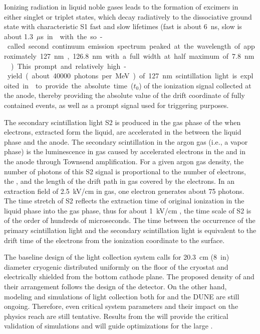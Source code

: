 Ionizing radiation in liquid noble gases leads to the formation of excimers in either singlet or triplet states, which decay radiatively to the dissociative ground state with characteristic S1 fast and slow lifetimes (fast is about \SI{6}{ns}, slow is about \SI{1.3}{$\mu$s} in \lar with the so-called second continuum emission spectrum peaked at the wavelength of approximately \SI{127}{nm}, \SI{126.8}{nm} with a full width at half maximum of \SI{7.8}{nm} \cite{Heindl}). This prompt and relatively high-yield (about \num{40000} photons per \si{MeV}) of \SI{127}{nm} scintillation light is exploited in \lartpc to provide the absolute time ($t_0$) of the ionization signal collected at the anode, thereby providing the absolute value of the drift coordinate of fully contained events, as well as a prompt signal used for triggering purposes.

The secondary scintillation light S2 is produced in the gas phase of the  when electrons, extracted form the liquid, are accelerated in the \efield between the liquid phase and the anode. The secondary scintillation in the argon gas (i.e., a vapor phase) is the luminescence in gas caused by accelerated electrons in the \efield and in the  anode through Townsend amplification. For a given argon gas density, the number of photons of this S2 signal is proportional to the number of electrons, the \efield, and the length of the drift path in gas covered by the electrons. In an extraction field of \SI{2.5}{kV/cm} in gas, one electron generates about \num{75} photons. The time stretch of S2 reflects the extraction time of original ionization in the liquid phase into the gas phase, thus for about \SI{1}{kV/cm} \efield, the time scale of S2 is of the order of hundreds of microseconds. The time between the occurrence of the primary scintillation light and the secondary scintillation light is equivalent to the drift time of the electrons from the ionization coordinate to the \lar surface.

The baseline design of the light collection system calls for \SI{20.3}{cm} (\SI{8}{in}) diameter cryogenic  distributed uniformly on the floor of the cryostat and electrically shielded from the bottom cathode plane. The proposed density of  and their arrangement follows the design of the  detector. On the other hand, modeling and simulations of light collection both for  and the DUNE  are still ongoing. Therefore, even critical system parameters and their impact on the physics reach are still tentative. Results from the  will provide the critical validation of simulations and will guide optimizations for the large .

